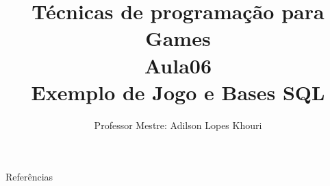 \documentclass[compress, hyperref={pdfpagelayout=SinglePage}]{beamer}
\title[AED - Aula 06]{Técnicas de programação para Games \\ Aula06 \\ Exemplo de Jogo e Bases SQL}
\author{Professor Mestre: Adilson Lopes Khouri}
\begin{document}
	\begin{frame}
		\titlepage
	\end{frame}
	
	
	
	

	
	
	
			
	

	

	\begin{frame}[allowframebreaks]{Referências}
			\tiny
			\nocite{*}
			
	    		
	\end{frame}
\end{document}
